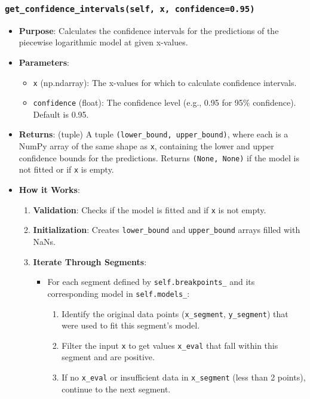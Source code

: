\documentclass[12pt,a4paper]{report}
\begin{document}
{\subsubsection{\texttt{get\_confidence\_intervals(self, x, confidence=0.95)}}
\begin{itemize}
    \item \textbf{Purpose}: Calculates the confidence intervals for the predictions of the piecewise logarithmic model at given x-values.
    \item \textbf{Parameters}:
        \begin{itemize}
            \item \texttt{x} (np.ndarray): The x-values for which to calculate confidence intervals.
            \item \texttt{confidence} (float): The confidence level (e.g., 0.95 for 95\% confidence). Default is 0.95.
        \end{itemize}
    \item \textbf{Returns}: (tuple) A tuple \texttt{(lower\_bound, upper\_bound)}, where each is a NumPy array of the same shape as \texttt{x}, containing the lower and upper confidence bounds for the predictions. Returns \texttt{(None, None)} if the model is not fitted or if \texttt{x} is empty.
    \item \textbf{How it Works}:
        \begin{enumerate}
            \item \textbf{Validation}: Checks if the model is fitted and if \texttt{x} is not empty.
            \item \textbf{Initialization}: Creates \texttt{lower\_bound} and \texttt{upper\_bound} arrays filled with NaNs.
            \item \textbf{Iterate Through Segments}:
                \begin{itemize}
                    \item For each segment defined by \texttt{self.breakpoints\_} and its corresponding model in \texttt{self.models\_}:
                        \begin{enumerate}
                            \item Identify the original data points (\texttt{x\_segment}, \texttt{y\_segment}) that were used to fit this segment's model.
                            \item Filter the input \texttt{x} to get values \texttt{x\_eval} that fall within this segment and are positive.
                            \item If no \texttt{x\_eval} or insufficient data in \texttt{x\_segment} (less than 2 points), continue to the next segment.

\end{enumerate}
\end{itemize}
\end{enumerate}
\end{itemize}}
\end{document}
